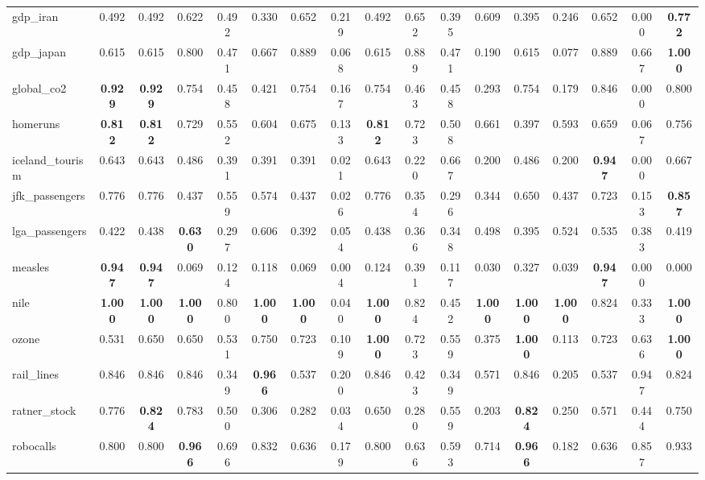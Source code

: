 \documentclass[11pt,a4paper]{article}
\begin{document}
\begin{table}
{\begin{tabular}{lcccccccccccccccc}
gdp\_iran & 0.492 & 0.492 & 0.622 & 0.492 & 0.330 & 0.652 & 0.219 & 0.492 & 0.652 & 0.395 & 0.609 & 0.395 & 0.246 & 0.652 & 0.000 & \textbf{0.772} \\
gdp\_japan & 0.615 & 0.615 & 0.800 & 0.471 & 0.667 & 0.889 & 0.068 & 0.615 & 0.889 & 0.471 & 0.190 & 0.615 & 0.077 & 0.889 & 0.667 & \textbf{1.000} \\
global\_co2 & \textbf{0.929} & \textbf{0.929} & 0.754 & 0.458 & 0.421 & 0.754 & 0.167 & 0.754 & 0.463 & 0.458 & 0.293 & 0.754 & 0.179 & 0.846 & 0.000 & 0.800 \\
homeruns & \textbf{0.812} & \textbf{0.812} & 0.729 & 0.552 & 0.604 & 0.675 & 0.133 & \textbf{0.812} & 0.723 & 0.508 & 0.661 & 0.397 & 0.593 & 0.659 & 0.067 & 0.756 \\
iceland\_tourism & 0.643 & 0.643 & 0.486 & 0.391 & 0.391 & 0.391 & 0.021 & 0.643 & 0.220 & 0.667 & 0.200 & 0.486 & 0.200 & \textbf{0.947} & 0.000 & 0.667 \\
jfk\_passengers & 0.776 & 0.776 & 0.437 & 0.559 & 0.574 & 0.437 & 0.026 & 0.776 & 0.354 & 0.296 & 0.344 & 0.650 & 0.437 & 0.723 & 0.153 & \textbf{0.857} \\
lga\_passengers & 0.422 & 0.438 & \textbf{0.630} & 0.297 & 0.606 & 0.392 & 0.054 & 0.438 & 0.366 & 0.348 & 0.498 & 0.395 & 0.524 & 0.535 & 0.383 & 0.419 \\
measles & \textbf{0.947} & \textbf{0.947} & 0.069 & 0.124 & 0.118 & 0.069 & 0.004 & 0.124 & 0.391 & 0.117 & 0.030 & 0.327 & 0.039 & \textbf{0.947} & 0.000 & 0.000 \\
nile & \textbf{1.000} & \textbf{1.000} & \textbf{1.000} & 0.800 & \textbf{1.000} & \textbf{1.000} & 0.040 & \textbf{1.000} & 0.824 & 0.452 & \textbf{1.000} & \textbf{1.000} & \textbf{1.000} & 0.824 & 0.333 & \textbf{1.000} \\
ozone & 0.531 & 0.650 & 0.650 & 0.531 & 0.750 & 0.723 & 0.109 & \textbf{1.000} & 0.723 & 0.559 & 0.375 & \textbf{1.000} & 0.113 & 0.723 & 0.636 & \textbf{1.000} \\
rail\_lines & 0.846 & 0.846 & 0.846 & 0.349 & \textbf{0.966} & 0.537 & 0.200 & 0.846 & 0.423 & 0.349 & 0.571 & 0.846 & 0.205 & 0.537 & 0.947 & 0.824 \\
ratner\_stock & 0.776 & \textbf{0.824} & 0.783 & 0.500 & 0.306 & 0.282 & 0.034 & 0.650 & 0.280 & 0.559 & 0.203 & \textbf{0.824} & 0.250 & 0.571 & 0.444 & 0.750 \\
robocalls & 0.800 & 0.800 & \textbf{0.966} & 0.696 & 0.832 & 0.636 & 0.179 & 0.800 & 0.636 & 0.593 & 0.714 & \textbf{0.966} & 0.182 & 0.636 & 0.857 & 0.933 \\

\end{tabular}}
\end{table}
\end{document}
